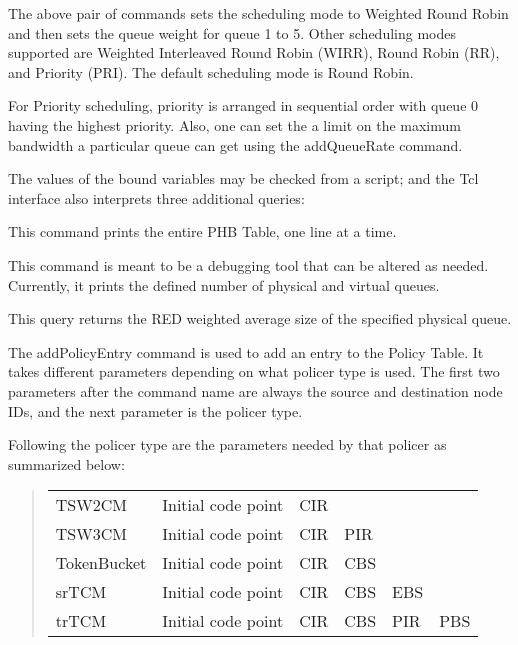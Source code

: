 The above pair of commands sets the scheduling mode to Weighted Round Robin and then sets the queue weight for queue 1 to 5. Other scheduling modes supported are Weighted Interleaved Round Robin (WIRR), Round Robin (RR), and Priority (PRI). The default scheduling mode is Round Robin.

For Priority scheduling, priority is arranged in sequential order with queue 0 having the highest priority. Also, one can set the a limit on the maximum bandwidth a particular queue can get using the addQueueRate command.




The values of the bound variables may be checked from a script; and the 
 Tcl interface also interprets three additional queries:


This command prints the entire PHB Table, one line at a time.


This command is meant to be a debugging tool that can be altered as needed.  Currently, it prints the defined number of physical and virtual queues.


This query returns the RED weighted average size of the specified physical queue.

The addPolicyEntry command is used to add an entry to the Policy Table.  It takes different parameters depending on what policer type is used.  The first two parameters after the command name are always the source and destination node IDs, and the next parameter is the policer type. 

Following the policer type are the parameters needed by that policer as summarized below:

\begin{quote}
\begin{tabular}{llllll}
TSW2CM&{Initial code point}&CIR\\
TSW3CM&{Initial code point}&CIR&PIR\\
TokenBucket&{Initial code point}&CIR&CBS\\
srTCM&{Initial code point}&CIR&CBS&EBS\\
trTCM&{Initial code point}&CIR&CBS&PIR&PBS
\end{tabular}
\end{quote}

